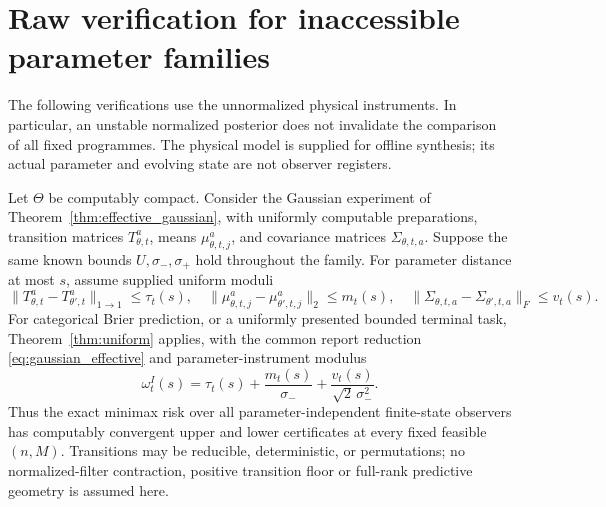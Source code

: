 \section{Raw verification for inaccessible parameter families}\label{sec:uniform_realizations}
The following verifications use the unnormalized physical instruments. In particular, an unstable normalized posterior does not invalidate the comparison of all fixed programmes. The physical model is supplied for offline synthesis; its actual parameter and evolving state are not observer registers.

\begin{theorem}\label{thm:uniform_gaussian}
Let $\Theta$ be computably compact. Consider the Gaussian experiment of Theorem~\ref{thm:effective_gaussian}, with uniformly computable preparations, transition matrices $T_{\theta,t}^a$, means $\mu_{\theta,t,j}^a$, and covariance matrices $\Sigma_{\theta,t,a}$. Suppose the same known bounds $U,\sigma_-,\sigma_+$ hold throughout the family. For parameter distance at most $s$, assume supplied uniform moduli
\[
 \|T_{\theta,t}^a-T_{\theta',t}^a\|_{1\to1}\le\tau_t(s),\quad
 \|\mu_{\theta,t,j}^a-\mu_{\theta',t,j}^a\|_2\le m_t(s),\quad
 \|\Sigma_{\theta,t,a}-\Sigma_{\theta',t,a}\|_F\le v_t(s).
\]
For categorical Brier prediction, or a uniformly presented bounded terminal task, Theorem~\ref{thm:uniform} applies, with the common report reduction \eqref{eq:gaussian_effective} and parameter-instrument modulus
\begin{equation}\label{eq:gaussian_parameter}
 \omega_t^I(s)=\tau_t(s)+\frac{m_t(s)}{\sigma_-}
                      +\frac{v_t(s)}{\sqrt2\,\sigma_-^2}.
\end{equation}
Thus the exact minimax risk over all parameter-independent finite-state observers has computably convergent upper and lower certificates at every fixed feasible $(n,M)$. Transitions may be reducible, deterministic, or permutations; no normalized-filter contraction, positive transition floor or full-rank predictive geometry is assumed here.
\end{theorem}
